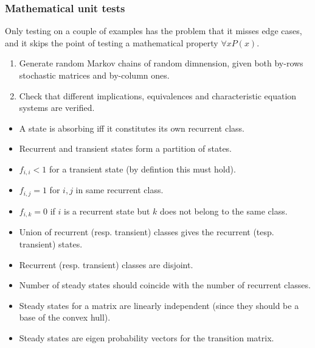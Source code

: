 \begin{frame}\frametitle{Mathematical unit tests}
    \vspace{2.5em}

    Only testing on a couple of examples has the problem that it misses edge cases, and
    it skips the point of testing a mathematical property \(\forall x P(x)\).

    \begin{enumerate}
    \item Generate random Markov chains of random dimnension, given both by-rows
    stochastic matrices and by-column ones.
    \item Check that different implications, equivalences and characteristic
    equation systems are verified.
    \end{enumerate}

    \begin{itemize}
    \item A state is absorbing iff it constitutes its own recurrent class.
    \item Recurrent and transient states form a partition of states.
    \item \(f_{i,i} < 1\) for a transient state (by defintion this must hold).
    \item \(f_{i,j} = 1\) for \(i,j\) in same recurrent class.
    \item \(f_{i,k} = 0\) if \(i\) is a recurrent state but \(k\) does not belong to
    the same class.
    \item Union of recurrent (resp. transient) classes gives the recurrent (tesp. transient) states.
    \item Recurrent (resp. transient) classes are disjoint.
    \item Number of steady states should coincide with the number of recurrent classes.
    \item Steady states for a matrix are linearly independent (since they should be a base of the convex hull).
    \item Steady states are eigen probability vectors for the transition matrix.
    \end{itemize}

\end{frame}
